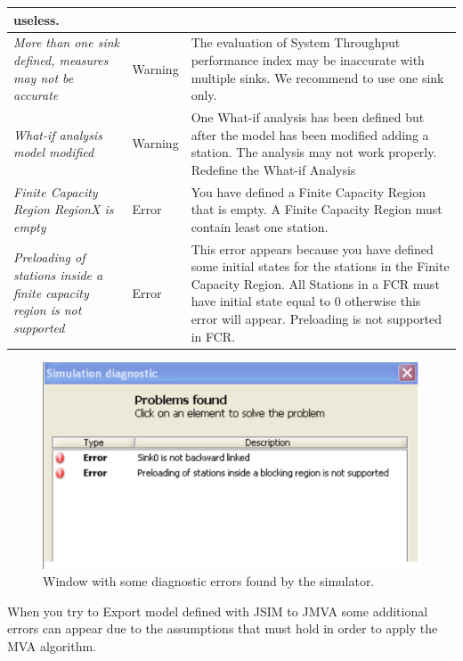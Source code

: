 {{\begin{tabular}{|l|l|l|}
{    useless.}\\ \hline
    \parbox{1.5in}{\emph{More than one sink defined, measures may not
    be accurate}}&Warning&
    \parbox{4in}{The evaluation of System Throughput performance
    index may be inaccurate with multiple sinks. We recommend to
    use one sink only.}\\ \hline
    \parbox{1.5in}{\emph{What-if analysis model modified}}&Warning&
    \parbox{4in}{One What-if analysis has been defined but after
    the model has been modified adding a station. The analysis
    may not work properly. Redefine the What-if Analysis}\\ \hline
    \parbox{1.5in}{\emph{Finite Capacity Region RegionX is empty}}
    &Error&\parbox{4in}{You have defined a Finite Capacity Region
    that is empty. A Finite Capacity Region must contain least
    one station.}\\ \hline
    \parbox{1.5in}{\emph{Preloading of stations inside a finite
    capacity region is not supported}}&Error&
    \parbox{4in}{This error appears because you have defined some
    initial states for the stations in the Finite Capacity Region.
    All Stations in a FCR must have initial state equal to 0
    otherwise this error will appear. Preloading is not supported
    in FCR.}\\ \hline
  \end{tabular}
}}

\begin{figure}[h]
    \begin{center}
        \includegraphics[scale=.5]{img/jsimg/10.1.eps}
    \end{center}
    \caption{Window with some diagnostic errors found by the simulator.}
    \label{fig:diagerr}
\end{figure}
When you try to Export model defined with JSIM to JMVA some
additional errors can appear due to the assumptions that must hold
in order to apply the MVA algorithm.\\

